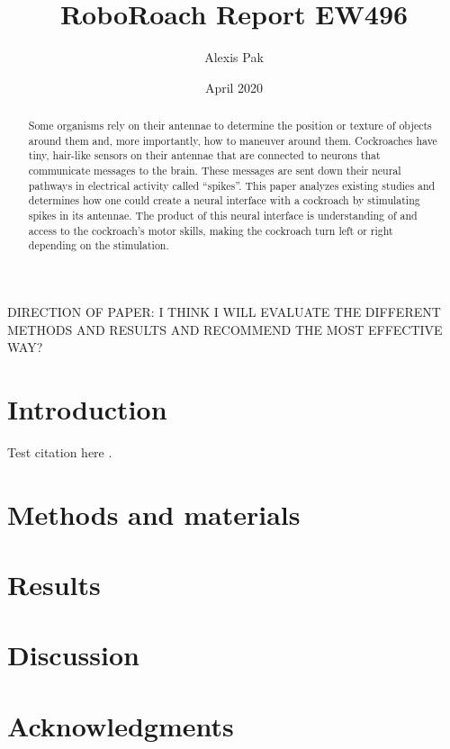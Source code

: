 \documentclass{article}
\title{RoboRoach Report EW496}
\author{Alexis Pak}
\date{April 2020}
\begin{document}
\maketitle
\begin{abstract}
Some organisms rely on their antennae to determine the position or texture of objects around them and, more importantly, how to maneuver around them. Cockroaches have tiny, hair-like sensors on their antennae that are connected to neurons that communicate messages to the brain. These messages are sent down their neural pathways in electrical activity called ``spikes''. This paper analyzes existing studies and determines how one could create a neural interface with a cockroach by stimulating spikes in its antennae. The product of this neural interface is understanding of and access to the cockroach's motor skills, making the cockroach turn left or right depending on the stimulation. 
\end{abstract}

DIRECTION OF PAPER: I THINK I WILL EVALUATE THE DIFFERENT METHODS AND RESULTS AND RECOMMEND THE MOST EFFECTIVE WAY?


\section{Introduction}
Test citation here \citep{buck2020go}.

\section{Methods and materials}
\section{Results}
\section{Discussion}
\section{Acknowledgments}


\end{document}
